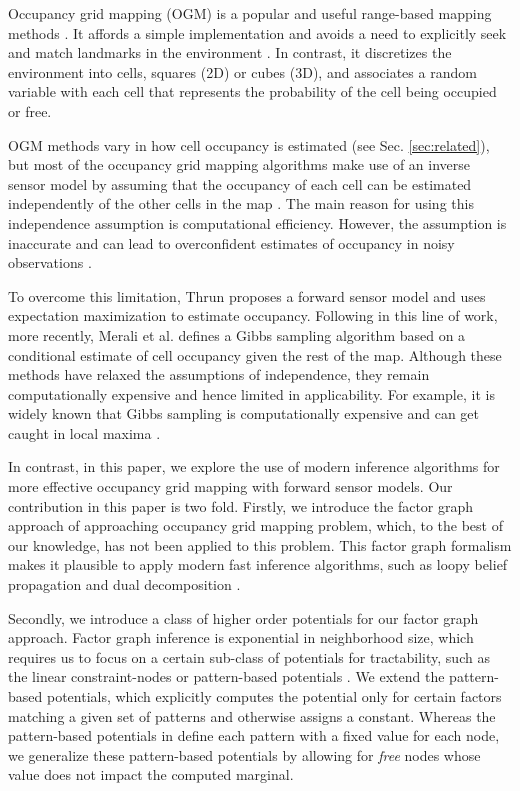 \documentclass[letterpaper, 10 pt, conference]{ieeeconf} %
\begin{document}
Occupancy grid mapping (OGM) is a popular and useful range-based mapping methods 
\cite{elfes1989using,moravec1988sensor}.  It affords a simple implementation and 
avoids a need to explicitly seek and match landmarks in the environment 
\cite{XXX}.  In contrast, it discretizes the environment into cells, squares 
(2D) or cubes (3D), and associates a random variable with each cell that 
represents the probability of the cell being occupied or free.  


OGM methods vary in how cell occupancy is estimated (see Sec.  
\ref{sec:related}), but most of the occupancy grid mapping algorithms make use 
of an inverse sensor model by assuming that the occupancy of each cell can be 
estimated independently of the other cells in the map 
\cite{elfes1989using,moravec1988sensor,newcombe2011kinectfusion}.  The main 
reason for using this independence assumption is computational efficiency.  
However, the assumption is inaccurate and can lead to overconfident estimates of 
occupancy in noisy observations \cite{thrun2003learning,merali2013icra}. 

To overcome this limitation, Thrun \cite{thrun2003learning} proposes a forward 
sensor model and uses expectation maximization to estimate occupancy.  Following 
in this line of work, more recently, Merali et al. \cite{merali2013icra} defines 
a Gibbs sampling algorithm based on a conditional estimate of cell occupancy 
given the rest of the map.   Although these methods have relaxed the assumptions 
of independence, they remain computationally expensive and hence limited in 
applicability.  For example, it is widely known that Gibbs sampling is 
computationally expensive and can get caught in local maxima \cite{LiBOOK2002}.

In contrast, in this paper, we explore the use of modern inference algorithms 
for more effective occupancy grid mapping with forward sensor models.
Our contribution in this paper is two fold. Firstly, we introduce the factor
graph approach of approaching occupancy grid mapping problem, which, to the
best of our knowledge, has not been applied to this problem.   This factor graph 
formalism makes it plausible to apply modern fast inference algorithms, such as 
loopy belief propagation \cite{kschischang2001factor} and dual decomposition 
\cite{sontag2011introduction}.  

Secondly, we introduce a class of higher order potentials for our factor graph 
approach.  Factor graph inference is exponential in neighborhood size, which 
requires us to focus on a certain sub-class of potentials for tractability, such 
as the linear constraint-nodes \cite{potetz2007efficient} or pattern-based 
potentials \cite{komodakis2009beyond}.  We extend the pattern-based potentials, 
which explicitly computes the potential only for certain factors matching a 
given set of patterns and otherwise assigns a constant.  Whereas the 
pattern-based potentials in \cite{komodakis2009beyond} define each pattern with 
a fixed value for each node, we generalize these pattern-based potentials by 
allowing for \textit{free} nodes whose value does not impact the computed 
marginal.  
\end{document}
